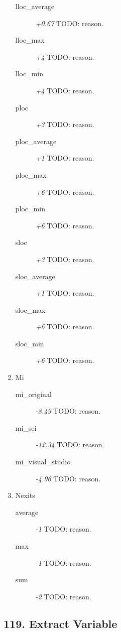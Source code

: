 \begin{enumerate}
\begin{description}
          \item [lloc\_average] \textit{+0.67} TODO: reason.
          \item [lloc\_max] \textit{+4} TODO: reason.
          \item [lloc\_min] \textit{+4} TODO: reason.
          \item [ploc] \textit{+3} TODO: reason.
          \item [ploc\_average] \textit{+1} TODO: reason.
          \item [ploc\_max] \textit{+6} TODO: reason.
          \item [ploc\_min] \textit{+6} TODO: reason.
          \item [sloc] \textit{+3} TODO: reason.
          \item [sloc\_average] \textit{+1} TODO: reason.
          \item [sloc\_max] \textit{+6} TODO: reason.
          \item [sloc\_min] \textit{+6} TODO: reason.
        \end{description}
  \item Mi
        \begin{description}
          \item [mi\_original] \textit{-8.49} TODO: reason.
          \item [mi\_sei] \textit{-12.34} TODO: reason.
          \item [mi\_visual\_studio] \textit{-4.96} TODO: reason.
        \end{description}
  \item Nexits
        \begin{description}
          \item [average] \textit{-1} TODO: reason.
          \item [max] \textit{-1} TODO: reason.
          \item [sum] \textit{-2} TODO: reason.
        \end{description}
\end{enumerate}
\subsection{119. Extract Variable}

